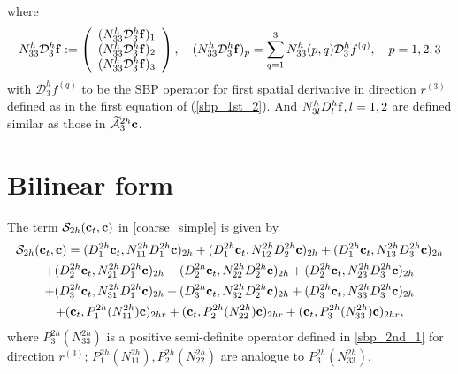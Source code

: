 where
\begin{align*}\label{gamma_D1}
{N}_{33}^h\mathcal{D}_3^h{\bf f} := \left(\begin{array}{c}
({N}_{33}^h\mathcal{D}_3^h{\bf f})_1 \\
({N}_{33}^h\mathcal{D}_3^h{\bf f})_2 \\
({N}_{33}^h\mathcal{D}_3^h{\bf f})_3 
\end{array}\right), \quad ({N}_{33}^h\mathcal{D}_3^h{\bf f})_p = \sum_{q = 1}^{3} N_{33}^h(p,q)\mathcal{D}_3^h{f}^{(q)},\quad p = 1,2,3
\end{align*}
with $\mathcal{D}_3^h{f}^{(q)}$ to be the SBP operator for first spatial derivative in direction $r^{(3)}$ defined as in the first equation of (\ref{sbp_1st_2}). And $N_{3l}^hD_l^h{\bf f}, l=1,2$ are defined similar as those in $\widetilde{\mathcal{A}}_3^{2h}{\bf c}$.

\section{Bilinear form}\label{appendix_bf}
The term $\mathcal{S}_{2h}({\bf c}_t,{\bf c})$ in \eqref{coarse_simple} is given by
\begin{multline*}
\mathcal{S}_{2h}({\bf c}_t,{\bf c}) = ({D}_1^{2h}{\bf c}_t,{N}_{11}^{2h}{D}_1^{2h}{\bf c})_{2h} +  ({D}_1^{2h}{\bf c}_t,{N}_{12}^{2h}{D}_2^{2h}{\bf c})_{2h} +  ({D}_1^{2h}{\bf c}_t,{N}_{13}^{2h}{D}_3^{2h}{\bf c})_{2h}\\
+  ({D}_2^{2h}{\bf c}_t,{N}_{21}^{2h}{D}_1^{2h}{\bf c})_{2h} 
+  ({D}_2^{2h}{\bf c}_t,{N}_{22}^{2h}{D}_2^{2h}{\bf c})_{2h} +  ({D}_2^{2h}{\bf c}_t,{N}_{23}^{2h}{D}_3^{2h}{\bf c})_{2h} \\
+  ({D}_3^{2h}{\bf c}_t,{N}_{31}^{2h}{D}_1^{2h}{\bf c})_{2h} 
+  ({D}_3^{2h}{\bf c}_t,{N}_{32}^{2h}{D}_2^{2h}{\bf c})_{2h} +  ({D}_3^{2h}{\bf c}_t,{N}_{33}^{2h}{D}_3^{2h}{\bf c})_{2h}\\
+ ({\bf c}_t, P^{2h}_1(N_{11}^{2h}){\bf c})_{2hr} + ({\bf c}_t, P^{2h}_2(N_{22}^{2h}){\bf c})_{2hr} + ({\bf c}_t, P^{2h}_3(N_{33}^{2h}){\bf c})_{2hr},
\end{multline*}
where $P_3^{2h}(N_{33}^{2h})$ is a positive semi-definite operator defined in \eqref{sbp_2nd_1} for direction $r^{(3)}$; $P_1^{2h}(N_{11}^{2h}), P_2^{2h}(N_{22}^{2h})$ are analogue to $P_3^{2h}(N_{33}^{2h})$. 

